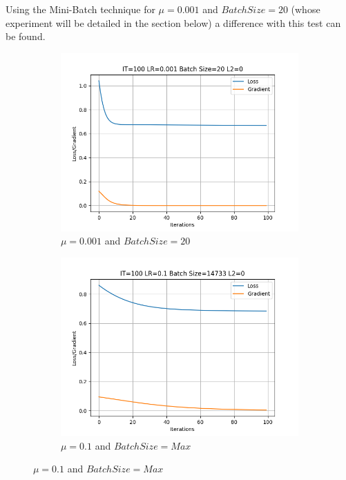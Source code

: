 \documentclass[
	letterpaper, %
	10pt, %
]{class}
\begin{document}
Using the Mini-Batch technique for $\mu=0.001$ and $Batch Size = 20$ (whose experiment will be detailed in the section below) a difference with this test can be found.

\begin{figure}[!h]
    \centering
    \begin{subfigure}{0.49\textwidth}
        \centering
        \includegraphics[width = \textwidth]{../images/graph_1.png}
        \caption{$\mu = 0.001$ and $Batch Size = 20$}
        \label{fig:left}
    \end{subfigure}
    \begin{subfigure}{0.49\textwidth}
        \centering
        \includegraphics[width = \textwidth]{../images/graph_2.png}
        \caption{$\mu = 0.1 $ and $Batch Size = Max$}
        \label{fig:right}
    \end{subfigure}
    \label{fig:combined}
\end{figure}
\end{document}
